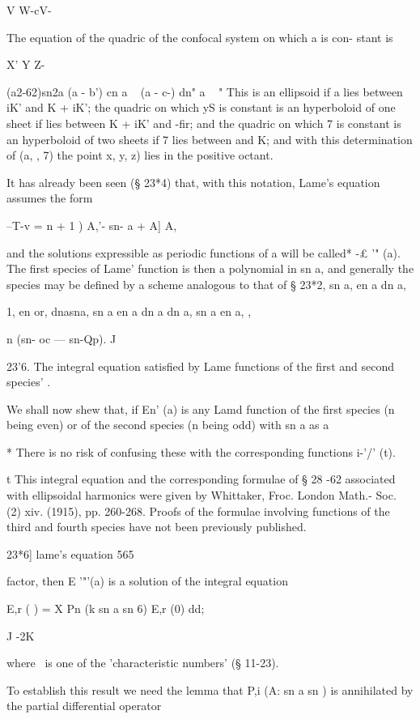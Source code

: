 {{{{{{{V W-cV-

The equation of the quadric of the confocal system on which a is con-
stant is

X' Y Z-

(a2-62)sn2a (a - b') cn a ~ (a - c-) dn" a ~ " This is an ellipsoid if
a lies between iK' and K + iK'; the quadric on which yS is constant
is an hyperboloid of one sheet if lies between K + iK' and -fir; and
the quadric on which 7 is constant is an hyperboloid of two sheets if
7 lies between and K; and with this determination of (a, , 7) the
point x, y, z) lies in the positive octant.

It has already been seen (§ 23*4) that, with this notation, Lame's
equation assumes the form

--T-v = n + 1 ) A,'- sn- a + A] A,

and the solutions expressible as periodic functions of a will be
called* -£ '" (a). The first species of Lame' function is then a
polynomial in sn a, and generally the species may be defined by a
scheme analogous to that of § 23*2, sn a, en a dn a,

1, en or, dnasna, sn a en a dn a dn a, sn a en a, ,

n (sn- oc — sn-Qp). J

23'6. The integral equation satisfied by Lame functions of the first
and second species' .

We shall now shew that, if En' (a) is any Lamd function of the first
species (n being even) or of the second species (n being odd) with sn
a as a

* There is no risk of confusing these with the corresponding functions
i-'/' (t).

t This integral equation and the corresponding formulae of § 28 -62
associated with ellipsoidal harmonics were given by Whittaker, Froc.
London Math.- Soc. (2) xiv. (1915), pp. 260-268. Proofs of the
formulae involving functions of the third and fourth species have not
been previously published.

23*6] lame's equation 565

factor, then E '"'(a) is a solution of the integral equation

E,r ( ) = X Pn (k sn a sn 6) E,r (0) dd;

J -2K

where \ is one of the 'characteristic numbers' (§ 11-23).

To establish this result we need the lemma that P,i (A: sn a sn ) is
annihilated by the partial differential operator

}}}}}}}
